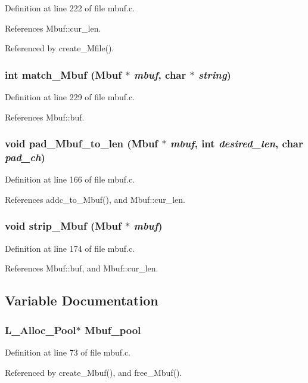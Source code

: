 Definition at line 222 of file mbuf.c.

References Mbuf::cur\_\-len.

Referenced by create\_\-Mfile().
\subsubsection{\setlength{\rightskip}{0pt plus 5cm}int match\_\-Mbuf (\bf{Mbuf} $\ast$ {\em mbuf}, char $\ast$ {\em string})}\label{mbuf_8h_eea3101e4e74dfac1f981eddb05a53cf}




Definition at line 229 of file mbuf.c.

References Mbuf::buf.
\subsubsection{\setlength{\rightskip}{0pt plus 5cm}void pad\_\-Mbuf\_\-to\_\-len (\bf{Mbuf} $\ast$ {\em mbuf}, int {\em desired\_\-len}, char {\em pad\_\-ch})}\label{mbuf_8h_36c7d7ed67081cd93a2e3a84af88ea34}




Definition at line 166 of file mbuf.c.

References addc\_\-to\_\-Mbuf(), and Mbuf::cur\_\-len.
\subsubsection{\setlength{\rightskip}{0pt plus 5cm}void strip\_\-Mbuf (\bf{Mbuf} $\ast$ {\em mbuf})}\label{mbuf_8h_4c99820608ec9edeb90d0d717252d3ca}




Definition at line 174 of file mbuf.c.

References Mbuf::buf, and Mbuf::cur\_\-len.

\subsection{Variable Documentation}
\subsubsection{\setlength{\rightskip}{0pt plus 5cm}\bf{L\_\-Alloc\_\-Pool}$\ast$ \bf{Mbuf\_\-pool}}\label{mbuf_8h_dbc02de02b86ec81b93cc0bcd7745aa9}




Definition at line 73 of file mbuf.c.

Referenced by create\_\-Mbuf(), and free\_\-Mbuf().